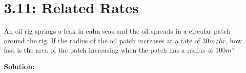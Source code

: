 \documentclass[answers]{exam}
\begin{document}
\section{3.11: Related Rates}

\begin{ex*}
  An oil rig springs a leak in calm seas and the oil spreads in a circular patch around the rig. If the radius of the oil patch increases at a rate of $30m/hr$, how fast is the area of the patch increasing when the patch has a radius of $100 m$?
\end{ex*}
\noindent
\textbf{Solution:}
\end{document}
